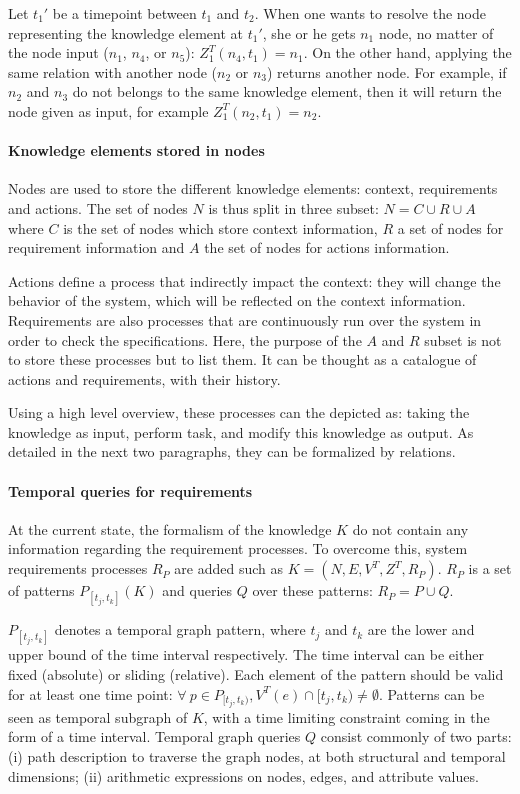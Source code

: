 Let $t_1'$ be a timepoint between $t_1$ and $t_2$.
When one wants to resolve the node representing the knowledge element at $t_1'$, she or he gets $n_1$ node, no matter of the node input ($n_1$, $n_4$, or $n_5$): $Z^{T}_1(n_4, t_1) = n_1$.
On the other hand, applying the same relation with another node ($n_2$ or $n_3$) returns another node.
For example, if $n_2$ and $n_3$ do not belongs to the same knowledge element, then it will return the node given as input, for example $Z^{T}_1(n_2, t_1) = n_2$.

\paragraph{Knowledge elements stored in nodes}
Nodes are used to store the different knowledge elements: context, requirements and actions.
The set of nodes $N$ is thus split in three subset: $N = C \cup R \cup A$ where $C$ is the set of nodes which store context information, $R$ a set of nodes for requirement information and $A$ the set of nodes for actions information.

Actions define a process that indirectly impact the context: they will change the behavior of the system, which will be reflected on the context information.
Requirements are also processes that are continuously run over the system in order to check the specifications.
Here, the purpose of the $A$ and $R$ subset is not to store these processes but to list them.
It can be thought as a catalogue of actions and requirements, with their history.

Using a high level overview, these processes can the depicted as: taking the knowledge as input, perform task, and modify this knowledge as output.
As detailed in the next two paragraphs, they can be formalized by relations.


\paragraph{Temporal queries for requirements}
At the current state, the formalism of the knowledge $K$ do not contain any information regarding the requirement processes.
To overcome this, system requirements processes $R_P$ are added such as $K = (N, E, V^T, Z^T, R_P)$.
$R_P$ is a set of patterns $P_{[t_j,t_k]}(K)$ and queries $Q$ over these patterns: $R_P = {P \cup Q}$. 

$P_{[t_j, t_k]}$ denotes a temporal graph pattern, where $t_j$ and $t_k$ are the lower and upper bound of the time interval respectively.
The time interval can be either fixed (absolute) or sliding (relative).
Each element of the pattern should be valid for at least one time point: $\forall~p \in P_{[t_j,t_k)}, V^T(e) \cap [t_j,t_k) \neq \emptyset$.
Patterns can be seen as temporal subgraph of $K$, with a time limiting constraint coming in the form of a time interval.
Temporal graph queries $Q$ consist commonly of two parts: (i) path description to traverse the graph nodes, at both structural and temporal dimensions; (ii) arithmetic expressions on nodes, edges, and attribute values.    

